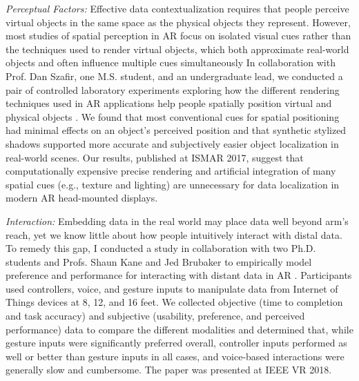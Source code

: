 \documentclass[11pt]{article}
\begin{document}
\emph{Perceptual Factors: }Effective data contextualization requires that people perceive virtual objects in the same space as the physical objects they represent. However, most studies of spatial perception in AR focus on isolated visual cues rather than the techniques used to render virtual objects, which both approximate real-world objects and often influence multiple cues simultaneously 
In collaboration with Prof. Dan Szafir, one M.S. student, and an undergraduate lead, we conducted a pair of controlled laboratory experiments exploring how the different rendering techniques used in AR applications 
help people spatially position virtual and physical objects
\cite{diaz2017designing}.  
We found that most conventional cues for spatial positioning had minimal effects on an object's perceived position and that synthetic stylized shadows supported more accurate and subjectively easier object localization in real-world scenes. Our results, published at ISMAR 2017,
 suggest that computationally expensive precise rendering and artificial integration of many spatial cues (e.g., texture and lighting) are unnecessary for data localization in modern AR head-mounted displays. 
 
\emph{Interaction: }Embedding data in the real world may place data well beyond arm's reach, yet we know little about how people intuitively interact with distal data.
To remedy this gap, I conducted a study in collaboration with two Ph.D. students and Profs. Shaun Kane and Jed Brubaker to empirically model preference and performance for interacting with distant data in AR \cite{whitlock2018Distal}. Participants used controllers, voice, and gesture inputs to manipulate data from Internet of Things devices at 8, 12, and 16 feet. We collected objective (time to completion and task accuracy) and subjective (usability, preference, and perceived performance) data to compare the different modalities and determined that, while gesture inputs were significantly preferred overall, controller inputs performed as well or better than gesture inputs in all cases, and voice-based interactions were generally slow and cumbersome. The paper was presented at IEEE VR 2018. 
\end{document}

